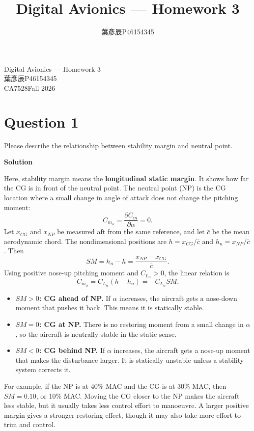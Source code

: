 \documentclass[12pt,a4paper]{article}
\title{Digital Avionics --- Homework 3}
\author{葉彥辰\quad P46154345}
\date{}
\begin{document}
\begin{center}
{\LARGE Digital Avionics --- Homework 3}\\[0.7em]
葉彥辰\quad P46154345\\[0.4em]
CA7528\quad Fall 2026
\end{center}

\section*{Question 1}
Please describe the relationship between stability margin and neutral point.

\textbf{Solution}

Here, stability margin means the \textbf{longitudinal static margin}. It shows how far the CG is in front of the neutral point. The neutral point (NP) is the CG location where a small change in angle of attack does not change the pitching moment:
\[
C_{m_\alpha}=\frac{\partial C_m}{\partial\alpha}=0.
\]
Let $x_{CG}$ and $x_{NP}$ be measured aft from the same reference, and let $\bar c$ be the mean aerodynamic chord. The nondimensional positions are $h=x_{CG}/\bar c$ and $h_n=x_{NP}/\bar c$. Then
\[
\boxed{SM=h_n-h=\frac{x_{NP}-x_{CG}}{\bar c}.}
\]
Using positive nose-up pitching moment and $C_{L_\alpha}>0$, the linear relation is
\[
\boxed{C_{m_\alpha}=C_{L_\alpha}(h-h_n)=-C_{L_\alpha}SM.}
\]
\begin{center}
\end{center}
\begin{itemize}
\item \textbf{$SM>0$: CG ahead of NP.} If $\alpha$ increases, the aircraft gets a nose-down moment that pushes it back. This means it is statically stable.
\item \textbf{$SM=0$: CG at NP.} There is no restoring moment from a small change in $\alpha$, so the aircraft is neutrally stable in the static sense.
\item \textbf{$SM<0$: CG behind NP.} If $\alpha$ increases, the aircraft gets a nose-up moment that makes the disturbance larger. It is statically unstable unless a stability system corrects it.
\end{itemize}
For example, if the NP is at $40\%$ MAC and the CG is at $30\%$ MAC, then $SM=0.10$, or $10\%$ MAC. Moving the CG closer to the NP makes the aircraft less stable, but it usually takes less control effort to manoeuvre. A larger positive margin gives a stronger restoring effect, though it may also take more effort to trim and control.
\end{document}
